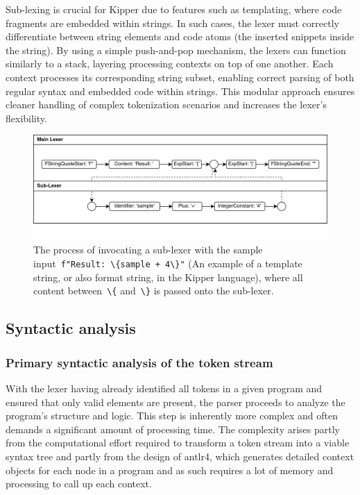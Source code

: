 Sub-lexing is crucial for Kipper due to features such as templating, where code fragments are embedded within strings. In such cases, the lexer must correctly differentiate between string elements and code atoms (the inserted snippets inside the string). By using a simple push-and-pop mechanism, the lexers can function similarly to a stack, layering processing contexts on top of one another. Each context processes its corresponding string subset, enabling correct parsing of both regular syntax and embedded code within strings. This modular approach ensures cleaner handling of complex tokenization scenarios and increases the lexer's flexibility.

\begin{figure}[h!]
	\centering
	\includegraphics[scale=0.8]{./pics/Sub-Lexer.drawio}
	\caption{The process of invocating a sub-lexer with the sample input~\lstinline|f"Result: \{sample + 4\}"| (An example of a template string, or also format string, in the Kipper language), where all content between~\lstinline|\{| and~\lstinline|\}| is passed onto the sub-lexer.}
	\label{fig:implementation:sub-lexer}
\end{figure}

\subsection{Syntactic analysis}

\subsubsection{Primary syntactic analysis of the token stream}

With the lexer having already identified all tokens in a given program and ensured that only valid elements are present, the parser proceeds to analyze the program's structure and logic. This step is inherently more complex and often demands a significant amount of processing time. The complexity arises partly from the computational effort required to transform a token stream into a viable syntax tree and partly from the design of \Gls{antlr4}, which generates detailed context objects for each node in a program and as such requires a lot of memory and processing to call up each context.

